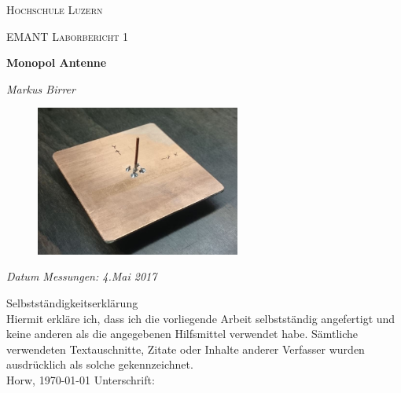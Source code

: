 \begin{titlepage}
	\centering
	
	{\scshape\LARGE Hochschule Luzern \par}
	\vspace{0.75cm}
	{\scshape\Large EMANT Laborbericht 1\par}
	\vspace{1cm}
	{\huge\bfseries Monopol Antenne\par}
	\vspace{1.5cm}
	{\Large\itshape Markus Birrer\par}
	\vspace{0.5cm}
	
	\begin{figure}[htbp]
		\centering
		\includegraphics[width=0.6\textwidth]{pic/Monopol_Antenne.JPG}
		\label{fig:MonopolAntenne}
	\end{figure}
	
		\vspace{0.5cm}
	
	{\Large\itshape Datum Messungen: 4.Mai 2017 \par}
	
	
	\vspace*{15 mm}
	\raggedright
	{\Large Selbstständigkeitserklärung} \\
	\vspace{0.5cm}
	Hiermit erkläre ich, dass ich die vorliegende Arbeit selbstständig angefertigt und keine anderen als die angegebenen Hilfsmittel verwendet habe. Sämtliche verwendeten Textauschnitte, Zitate oder Inhalte anderer Verfasser wurden ausdrücklich als solche gekennzeichnet. \\
	\vspace{1cm}
	{\large Horw, \today      \hspace{150pt} Unterschrift:}   
	
	
  
	

	\vfill

\end{titlepage}

\newpage
